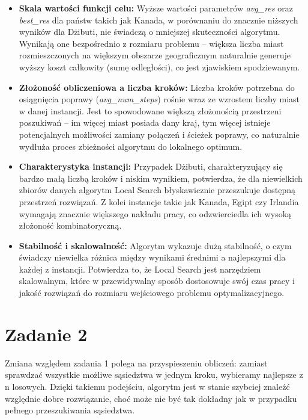 \documentclass{article}
\begin{document}
\begin{itemize}
    \item \textbf{Skala wartości funkcji celu:} Wyższe wartości parametrów \textit{avg\_res} oraz \textit{best\_res} dla państw takich jak Kanada, w porównaniu do znacznie niższych wyników dla Dżibuti, nie świadczą o mniejszej skuteczności algorytmu. Wynikają one bezpośrednio z rozmiaru problemu – większa liczba miast rozmieszczonych na większym obszarze geograficznym naturalnie generuje wyższy koszt całkowity (sumę odległości), co jest zjawiskiem spodziewanym.
    
    \item \textbf{Złożoność obliczeniowa a liczba kroków:} Liczba kroków potrzebna do osiągnięcia poprawy (\textit{avg\_num\_steps}) rośnie wraz ze wzrostem liczby miast w danej instancji. Jest to spowodowane większą złożonością przestrzeni poszukiwań – im więcej miast posiada dany kraj, tym więcej istnieje potencjalnych możliwości zamiany połączeń i ścieżek poprawy, co naturalnie wydłuża proces zbieżności algorytmu do lokalnego optimum.
    
    \item \textbf{Charakterystyka instancji:} Przypadek Dżibuti, charakteryzujący się bardzo małą liczbą kroków i niskim wynikiem, potwierdza, że dla niewielkich zbiorów danych algorytm Local Search błyskawicznie przeszukuje dostępną przestrzeń rozwiązań. Z kolei instancje takie jak Kanada, Egipt czy Irlandia wymagają znacznie większego nakładu pracy, co odzwierciedla ich wysoką złożoność kombinatoryczną.
    
    \item \textbf{Stabilność i skalowalność:} Algorytm wykazuje dużą stabilność, o czym świadczy niewielka różnica między wynikami średnimi a najlepszymi dla każdej z instancji. Potwierdza to, że Local Search jest narzędziem skalowalnym, które w przewidywalny sposób dostosowuje swój czas pracy i jakość rozwiązań do rozmiaru wejściowego problemu optymalizacyjnego.
\end{itemize}

\section*{Zadanie 2}
Zmiana względem zadania 1 polega na przyspieszeniu obliczeń: zamiast sprawdzać wszystkie możliwe sąsiedztwa w jednym kroku, wybieramy najlepsze z n losowych.
Dzięki takiemu podejściu, algorytm jest w stanie szybciej znaleźć względnie dobre rozwiązanie, choć może nie być tak dokładny jak w przypadku pełnego przeszukiwania sąsiedztwa.
\end{document}
